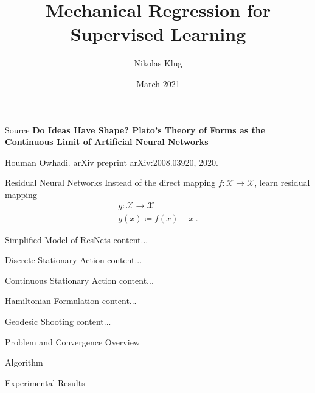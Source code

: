 \documentclass[8pt]{beamer}
\title[]{Mechanical Regression for Supervised Learning}
\author[Nikolas Klug]{Nikolas Klug}
\institute[University of Augsburg]{University of Augsburg}
\date{\nth{25} March 2021}
\newcommand{\cX}{\mathcal{X}}
\begin{document}
	{
	\begin{frame}
		\titlepage
	\end{frame}
	}
	\addtocounter{framenumber}{-1}

	\begin{frame}{Source}
		\textbf{Do Ideas Have Shape? Plato's Theory of Forms as the Continuous Limit of Artificial Neural Networks}\linebreak
		\begin{footnotesize}
			Houman Owhadi.\linebreak
			arXiv preprint arXiv:2008.03920, 2020.
		\end{footnotesize}
	\end{frame}

	\begin{frame}{Residual Neural Networks}
		Instead of the direct mapping $f: \cX \rightarrow \cX$, learn residual mapping 
		\begin{gather*}
			g: \cX \rightarrow \cX\\
			g(x) \coloneqq f(x) - x \ .
		\end{gather*}
		
	\end{frame}

	\begin{frame}{Simplified Model of ResNets}
		content...
	\end{frame}

	\begin{frame}{Discrete Stationary Action}
		content...
	\end{frame}
	
	\begin{frame}{Continuous Stationary Action}
		content...
	\end{frame}

	\begin{frame}{Hamiltonian Formulation}
		content...
	\end{frame}

	\begin{frame}{Geodesic Shooting}
		content...
	\end{frame}

	\begin{frame}{Problem and Convergence Overview}
		
	\end{frame}

	\begin{frame}{Algorithm}
	\end{frame}

	\begin{frame}{Experimental Results}
	\end{frame}


	\begin{frame}
		
		
	\end{frame}
\end{document}
